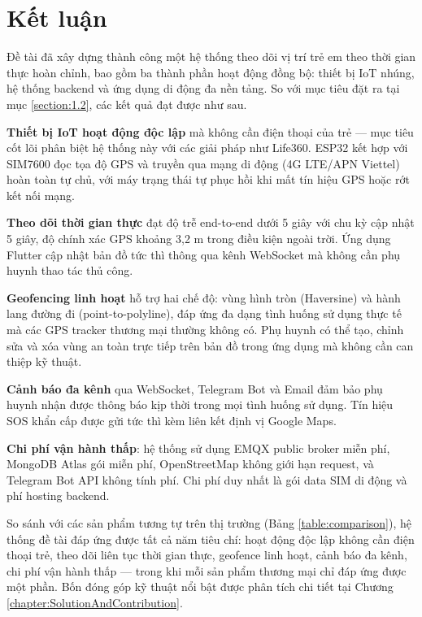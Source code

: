 \documentclass[../DoAn.tex]{subfiles}
\begin{document}
\section{Kết luận}
\label{section:6.1}

Đề tài đã xây dựng thành công một hệ thống theo dõi vị trí trẻ em theo thời gian thực hoàn chỉnh, bao gồm ba thành phần hoạt động đồng bộ: thiết bị IoT nhúng, hệ thống backend và ứng dụng di động đa nền tảng. So với mục tiêu đặt ra tại mục \ref{section:1.2}, các kết quả đạt được như sau.

\textbf{Thiết bị IoT hoạt động độc lập} mà không cần điện thoại của trẻ — mục tiêu cốt lõi phân biệt hệ thống này với các giải pháp như Life360. ESP32 kết hợp với SIM7600 đọc tọa độ GPS và truyền qua mạng di động (4G LTE/APN Viettel) hoàn toàn tự chủ, với máy trạng thái tự phục hồi khi mất tín hiệu GPS hoặc rớt kết nối mạng.

\textbf{Theo dõi thời gian thực} đạt độ trễ end-to-end dưới 5 giây với chu kỳ cập nhật 5 giây, độ chính xác GPS khoảng 3,2 m trong điều kiện ngoài trời. Ứng dụng Flutter cập nhật bản đồ tức thì thông qua kênh WebSocket mà không cần phụ huynh thao tác thủ công.

\textbf{Geofencing linh hoạt} hỗ trợ hai chế độ: vùng hình tròn (Haversine) và hành lang đường đi (point-to-polyline), đáp ứng đa dạng tình huống sử dụng thực tế mà các GPS tracker thương mại thường không có. Phụ huynh có thể tạo, chỉnh sửa và xóa vùng an toàn trực tiếp trên bản đồ trong ứng dụng mà không cần can thiệp kỹ thuật.

\textbf{Cảnh báo đa kênh} qua WebSocket, Telegram Bot và Email đảm bảo phụ huynh nhận được thông báo kịp thời trong mọi tình huống sử dụng. Tín hiệu SOS khẩn cấp được gửi tức thì kèm liên kết định vị Google Maps.

\textbf{Chi phí vận hành thấp}: hệ thống sử dụng EMQX public broker miễn phí, MongoDB Atlas gói miễn phí, OpenStreetMap không giới hạn request, và Telegram Bot API không tính phí. Chi phí duy nhất là gói data SIM di động và phí hosting backend.

So sánh với các sản phẩm tương tự trên thị trường (Bảng \ref{table:comparison}), hệ thống đề tài đáp ứng được tất cả năm tiêu chí: hoạt động độc lập không cần điện thoại trẻ, theo dõi liên tục thời gian thực, geofence linh hoạt, cảnh báo đa kênh, chi phí vận hành thấp — trong khi mỗi sản phẩm thương mại chỉ đáp ứng được một phần. Bốn đóng góp kỹ thuật nổi bật được phân tích chi tiết tại Chương \ref{chapter:SolutionAndContribution}.
\end{document}
